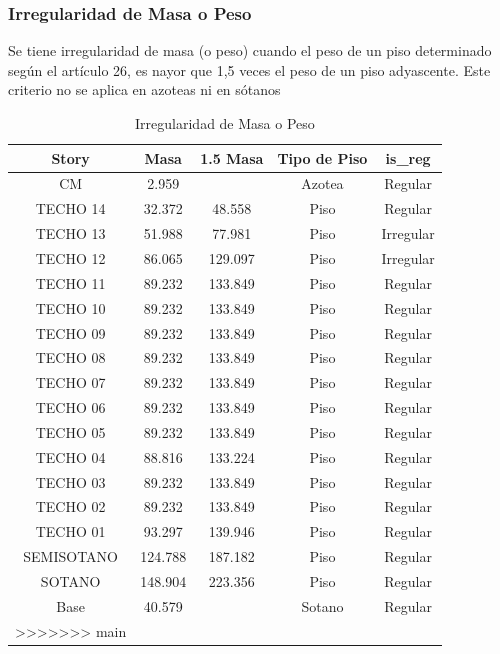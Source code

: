 \documentclass{article}%
\begin{document}
%
\subsubsection{Irregularidad de Masa o Peso}%
\label{ssubsec:IrregularidaddeMasaoPeso}%
\begin{tcolorbox}[colback=gray!5!white,colframe=cyan!75!black,fonttitle=\bfseries,title=Tabla N°9 E-030]%
Se tiene irregularidad de masa (o peso) cuando el peso de un piso determinado según el artículo 26, es nayor que 1,5 veces el peso de un piso adyascente. Este criterio no se aplica en azoteas ni en sótanos%
\end{tcolorbox}%


\begin{table}[H]%
\centering%
\caption{Irregularidad de Masa o Peso}%
\begin{tabular}{ccccc}
\toprule
Story & Masa & 1.5 Masa & Tipo de Piso & is\_reg \\
\midrule
CM & 2.959 &  & Azotea & Regular \\
TECHO 14 & 32.372 & 48.558 & Piso & Regular \\
TECHO 13 & 51.988 & 77.981 & Piso & Irregular \\
TECHO 12 & 86.065 & 129.097 & Piso & Irregular \\
TECHO 11 & 89.232 & 133.849 & Piso & Regular \\
TECHO 10 & 89.232 & 133.849 & Piso & Regular \\
TECHO 09 & 89.232 & 133.849 & Piso & Regular \\
TECHO 08 & 89.232 & 133.849 & Piso & Regular \\
TECHO 07 & 89.232 & 133.849 & Piso & Regular \\
TECHO 06 & 89.232 & 133.849 & Piso & Regular \\
TECHO 05 & 89.232 & 133.849 & Piso & Regular \\
TECHO 04 & 88.816 & 133.224 & Piso & Regular \\
TECHO 03 & 89.232 & 133.849 & Piso & Regular \\
TECHO 02 & 89.232 & 133.849 & Piso & Regular \\
TECHO 01 & 93.297 & 139.946 & Piso & Regular \\
SEMISOTANO & 124.788 & 187.182 & Piso & Regular \\
SOTANO & 148.904 & 223.356 & Piso & Regular \\
Base & 40.579 &  & Sotano & Regular \\
>>>>>>> main
\bottomrule
\end{tabular}
%
\end{table}
\end{document}
